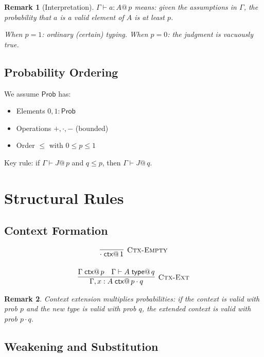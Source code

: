 \documentclass[11pt,a4paper]{article}
\makeatletter
\newtheorem{remark}{Remark}[section]
\newcommand{\ctx}{\;\mathsf{ctx}}
\newcommand{\type}{\;\mathsf{type}}
\newcommand{\Prob}{\mathsf{Prob}}
\newcommand{\pmark}[1]{@\, #1}  %
\makeatother
\begin{document}
\begin{remark}[Interpretation]
$\Gamma \vdash a : A \pmark{p}$ means: given the assumptions in $\Gamma$, the probability that $a$ is a valid element of $A$ is at least $p$.

When $p = 1$: ordinary (certain) typing.
When $p = 0$: the judgment is vacuously true.
\end{remark}

\subsection{Probability Ordering}

We assume $\Prob$ has:
\begin{itemize}
    \item Elements $0, 1 : \Prob$
    \item Operations $+, \cdot, -$ (bounded)
    \item Order $\leq$ with $0 \leq p \leq 1$
\end{itemize}

Key rule: if $\Gamma \vdash J \pmark{p}$ and $q \leq p$, then $\Gamma \vdash J \pmark{q}$.

\section{Structural Rules}

\subsection{Context Formation}

\begin{gather}
\infer[\textsc{Ctx-Empty}]
  {\cdot \ctx \pmark{1}}
  {}
\\[1em]
\infer[\textsc{Ctx-Ext}]
  {\Gamma, x : A \ctx \pmark{p \cdot q}}
  {\Gamma \ctx \pmark{p} & \Gamma \vdash A \type \pmark{q}}
\end{gather}

\begin{remark}
Context extension multiplies probabilities: if the context is valid with prob $p$ and the new type is valid with prob $q$, the extended context is valid with prob $p \cdot q$.
\end{remark}

\subsection{Weakening and Substitution}
\end{document}
